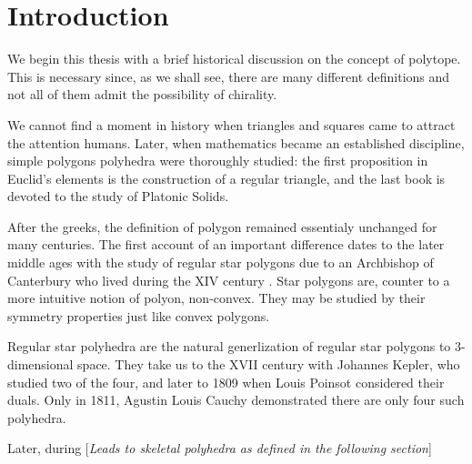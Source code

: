 \documentclass[spanish]{article}
\theoremstyle{definition}
\begin{document}
	\section{Introduction}
	We begin this thesis with a brief historical discussion on the concept of polytope. This is necessary since, as we shall see, there are many different definitions and not all of them admit the possibility of chirality.
	
	We cannot find a moment in history when triangles and squares came to attract the attention humans. Later, when mathematics became an established discipline, simple polygons polyhedra were thoroughly studied: the first proposition in Euclid's elements is the construction of a regular triangle, and the last book is devoted to the study of Platonic Solids.
	
	After the greeks, the definition of polygon remained essentialy unchanged for many centuries. The first account of an important difference dates to the later middle ages with the study of regular star polygons due to an Archbishop of Canterbury who lived during the XIV century \cite{abstract-polytopes}. Star polygons are, counter to a more intuitive notion of polyon, non-convex. They may be studied by their symmetry properties just like convex polygons.
	
	Regular star polyhedra are the natural generlization of regular star polygons to 3-dimensional space. They take us to the XVII century with Johannes Kepler, who studied two of the four, and later to 1809 when Louis Poinsot considered their duals. Only in 1811, Agustin Louis Cauchy demonstrated there are only four such polyhedra.
	
	Later, during [\textit{Leads to skeletal polyhedra as defined in the following section}]
	
\end{document}

